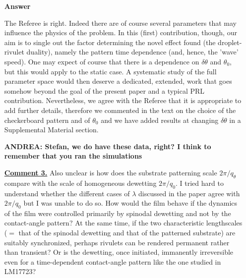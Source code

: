 \documentclass[12pt,english]{article}
\begin{document}
\begin{itemize}
\item[ \textbf{{Answer}}]
{ 
The Referee is right. Indeed there are of course several parameters 
that may influence the physics of the problem. In this (first) contribution, though,
our aim is to single out the factor determining the novel effect found (the 
droplet-rivulet duality), namely
the pattern time dependence (and, hence, the 'wave' speed). 
One may expect of course that there is a dependence on $\delta \theta$ and $\theta_0$, but this would apply to the static case. 
A systematic study of the full parameter space would then deserve a dedicated, 
extended, work that goes somehow beyond the goal of the present paper and a typical PRL contribution.
Nevertheless, we agree with the Referee that it is appropriate to add further details, therefore we commented in the text 
on the choice of the checkerboard pattern and of $\theta_0$ and we have added 
results at changing $\delta \theta$ in a Supplemental Material section.

{\bf ANDREA: Stefan, we do have these data, right? I think to remember that you ran the simulations}




}

\item[ \textbf{\underline{Comment 3.}}]
{ 
Also unclear is how does the substrate patterning scale $2\pi/q_\theta$ compare with the scale of homogeneous dewetting $2\pi/q_0$.
I tried hard to understand whether the different cases of $\lambda$ discussed in the paper agree with $2\pi/q_0$ but I was unable to do so. 
How would the film behave if the dynamics of the film were controlled primarily by spinodal dewetting and not by the contact-angle pattern?
At the same time, if the two characteristic lengthscales ($=$ that of the spinodal dewetting and that of the patterned substrate) are suitably synchronized, perhaps rivulets can be rendered permanent rather than transient? Or is the dewetting, once initiated, immanently irreversible even for a
time-dependent contact-angle pattern like the one studied in LM17723?
}


\end{itemize}
\end{document}

